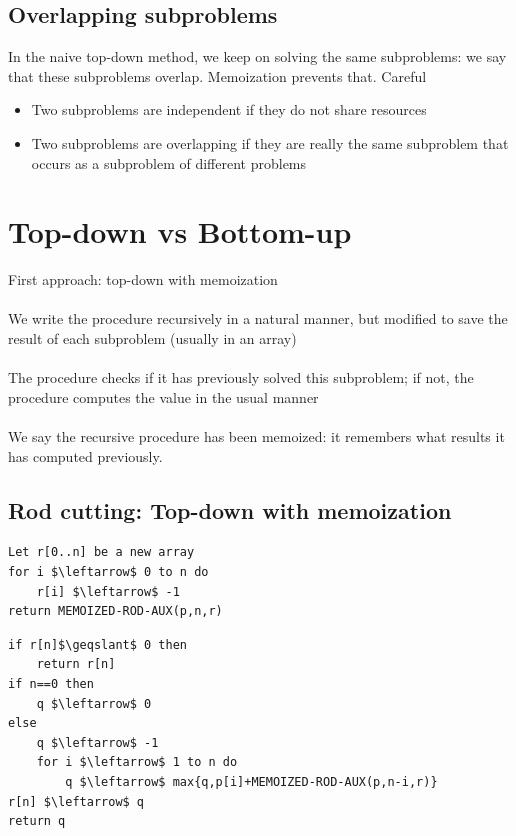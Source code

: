 \documentclass{article}[18pt]
\begin{document}
\subsection{Overlapping subproblems}
In the naive top-down method, we keep on solving the same subproblems: we say that these subproblems overlap. Memoization prevents that. Careful
\begin{itemize}
	\item Two subproblems are independent if they do not share resources
	\item Two subproblems are overlapping if they are really the same subproblem that occurs as a subproblem of different problems
\end{itemize}
\section{Top-down vs Bottom-up}
First approach: top-down with memoization\\
\\
We write the procedure recursively in a natural manner, but modified to save the result of each subproblem (usually in an array)\\
\\
The procedure checks if it has previously solved this subproblem; if not, the procedure computes the value in the usual manner\\
\\
We say the recursive procedure has been memoized: it remembers what results it has computed previously.
\subsection{Rod cutting: Top-down with memoization}
\begin{lstlisting}[caption=MEMOIZED-ROD({p,n})]
Let r[0..n] be a new array
for i $\leftarrow$ 0 to n do
	r[i] $\leftarrow$ -1
return MEMOIZED-ROD-AUX(p,n,r)
\end{lstlisting}

\begin{lstlisting}[caption=MEMOIZED-ROD-AUX({p,n,r})]
if r[n]$\geqslant$ 0 then
	return r[n]
if n==0 then
	q $\leftarrow$ 0
else
	q $\leftarrow$ -1
	for i $\leftarrow$ 1 to n do
		q $\leftarrow$ max{q,p[i]+MEMOIZED-ROD-AUX(p,n-i,r)}
r[n] $\leftarrow$ q
return q
\end{lstlisting}
\end{document}
